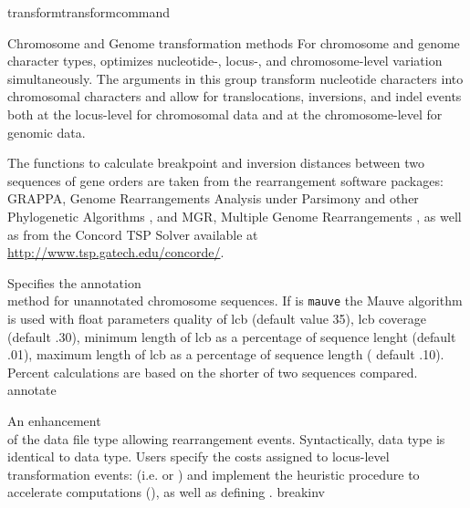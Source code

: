 \begin{command}{transform}{transformcommand}
\begin{arguments}
        \begin{argumentgroup}{Chromosome and Genome transformation methods}
            For chromosome and genome character types, \poy optimizes nucleotide-, 
            locus-, and chromosome-level variation simultaneously. The arguments in this group
            transform nucleotide characters into chromosomal characters and allow for 
            translocations, inversions, and indel events both at the locus-level for chromosomal data 
            and at the chromosome-level for genomic data.
           
            The functions to calculate breakpoint and inversion distances between
            two sequences of gene orders are taken from the rearrangement software
            packages: GRAPPA, Genome Rearrangements Analysis under Parsimony and
            other Phylogenetic Algorithms \cite{baderetal2002}, and MGR, Multiple
            Genome Rearrangements \cite{bourqueandpevzner2002}, as well as from
            the Concord TSP Solver available at \url{http://www.tsp.gatech.edu/concorde/}.

                {Specifies the annotation \\method for unannotated chromosome sequences.
                If \poylident is \texttt{mauve} the Mauve algorithm is used \cite{darlingetal2004} with
                float parameters quality of lcb (default value 35), lcb coverage (default .30), 
                minimum length of lcb as a percentage of sequence lenght (default .01), 
                maximum length of lcb as a percentage of sequence length ( default .10).  
                Percent calculations are based on the shorter of two sequences compared.}
                {annotate}
                        
                {An enhancement \\ of the data file type  allowing
            rearrangement events. Syntactically,  data type is identical to 
             data type. Users specify 
                the costs assigned to locus-level transformation events: (i.e. 
                 or  ) 
                and implement the heuristic  procedure to accelerate computations 
                (), as well as defining .} 
                {breakinv}
                

\end{argumentgroup}
\end{arguments}
\end{command}
